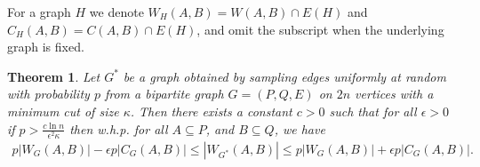 \documentclass[11pt]{article}
\newcommand{\e}{{\epsilon}}
\newtheorem{theorem}{Theorem}[section]
\begin{document}
For a graph $H$ we denote $W_H(A, B)=W(A,B)\cap E(H)$ and $C_H(A, B)=C(A, B)\cap E(H)$, and omit the subscript when the
underlying graph is fixed.
\begin{theorem} \label{thm:ss}
Let $G^*$ be a graph obtained by sampling edges uniformly at random with
probability $p$ from a bipartite graph $G=(P, Q, E)$ on $2n$ vertices with a minimum cut of size
$\kappa$. Then there
exists a constant $c>0$ such that for all $\e>0$ if $p > \frac{c \ln n}{\e^2 \kappa}$
then w.h.p. for all $A \subseteq P$, and $B \subseteq Q$, we have
\begin{equation*}
\begin{split}
p|W_G(A,B)| - \e p| C_G(A,B) |\leq |W_{G^*}(A,B) |\leq p|W_G(A,B)| + \e p| C_G(A,B) |.
\end{split}
\end{equation*}
\end{theorem}
\end{document}

